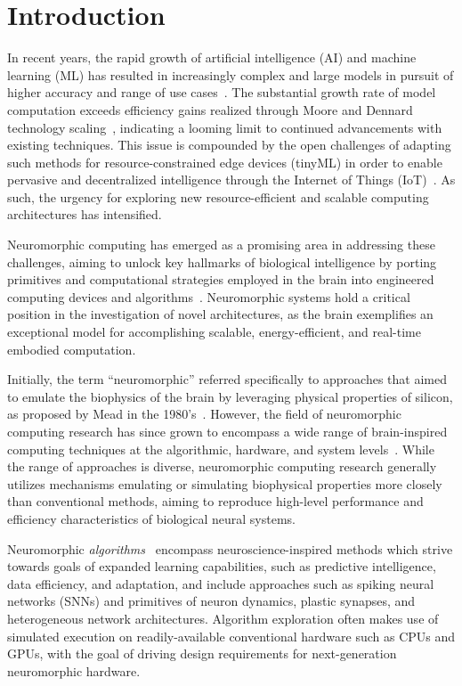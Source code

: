 
\section*{Introduction} %

In recent years, the rapid growth of artificial intelligence (AI) and machine learning (ML) has resulted in increasingly complex and large models in pursuit of higher accuracy and range of use cases~\cite{sevilla22computetrends}.
The substantial growth rate of model computation exceeds efficiency gains realized through Moore and Dennard technology scaling~\cite{shankar22trends}, indicating a looming limit to continued advancements with existing techniques.
This issue is compounded by the open challenges of adapting such methods for resource-constrained edge devices (tinyML) in order to enable pervasive and decentralized intelligence through the Internet of Things (IoT)~\cite{ray22tinyml}.
As such, the urgency for exploring new resource-efficient and scalable computing architectures has intensified.

Neuromorphic computing has emerged as a promising area in addressing these challenges, aiming to unlock key hallmarks of biological intelligence by porting primitives and computational strategies employed in the brain into engineered computing devices and algorithms~\cite{schuman2017survey, james17historical, thakur2018largescale}.
Neuromorphic systems hold a critical position in the investigation of novel architectures, as the brain exemplifies an exceptional model for accomplishing scalable, energy-efficient, and real-time embodied computation.

Initially, the term ``neuromorphic'' referred specifically to approaches that aimed to emulate the biophysics of the brain by leveraging physical properties of silicon, as proposed by Mead in the 1980's~\cite{Mead:1990hw}. However, the field of neuromorphic computing research has since grown to encompass a wide range of brain-inspired computing techniques at the algorithmic, hardware, and system levels~\cite{schuman2017survey}. 
While the range of approaches is diverse, neuromorphic computing research generally utilizes mechanisms emulating or simulating biophysical properties more closely than conventional methods, aiming to reproduce high-level performance and efficiency characteristics of biological neural systems. 

Neuromorphic \textit{algorithms}~\cite{Schuman2022} encompass neuroscience-inspired methods which strive towards goals of expanded learning capabilities, such as predictive intelligence, data efficiency, and adaptation, and include approaches such as spiking neural networks (SNNs) and primitives of neuron dynamics, plastic synapses, and heterogeneous network architectures.
Algorithm exploration often makes use of simulated execution on readily-available conventional hardware such as CPUs and GPUs, with the goal of driving design requirements for next-generation neuromorphic hardware. 

